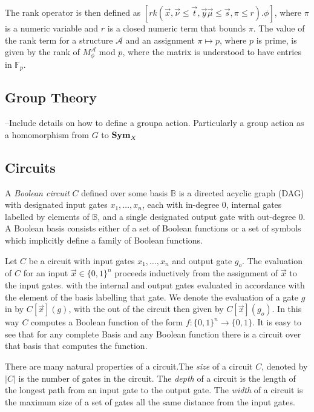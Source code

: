 \documentclass[../paper.tex]{subfiles}
\begin{document}
The rank operator is then defined as $[rk (\vec{x}, \vec {\nu} \leq \vec{t},
\vec{y}\vec{\mu} \leq \vec{s}, \pi \leq r). \phi]$, where $\pi$ is a numeric
variable and $r$ is a closed numeric term that bounds $\pi$. The value of the
rank term for a structure $\mathcal{A}$ and an assignment $\pi \mapsto p$, where
$p$ is prime, is given by the rank  of $M^{\mathcal{A}}_\phi$ mod $p$, where the
matrix is understood to have entries in $\mathbb{F}_p$.

\subsection{Group Theory}
--Include details on how to define a groupa action. Particularly a group action
as a homomorphism from $G$ to $\text{\textbf{Sym}}_X$

\subsection{Circuits}
A \emph{Boolean circuit} $C$ defined over some basis $\mathbb{B}$ is a directed
acyclic graph (DAG) with designated input gates $x_1, \ldots, x_n$, each with
in-degree $0$, internal gates labelled by elements of $\mathbb{B}$, and a single
designated output gate with out-degree 0. A Boolean basis consists either of a
set of Boolean functions or a set of symbols which implicitly define a family of
Boolean functions.

Let $C$ be a circuit with input gates $x_1, \ldots, x_n$ and output gate $g_o$.
The evaluation of $C$ for an input $\vec{x}\in \{0,1\}^n$ proceeds inductively
from the assignment of $\vec{x}$ to the input gates. with the internal and
output gates evaluated in accordance with the element of the basis labelling
that gate. We denote the evaluation of a gate $g$ in by $C[\vec{x}](g)$, with
the out of the circuit then given by $C[\vec{x}](g_o)$. In this way $C$ computes
a Boolean function of the form $f:\{0,1\}^n \rightarrow \{0,1\}$. It is easy to
see that for any complete Basis and any Boolean function there is a circuit over
that basis that computes the function.


There are many natural properties of a circuit.The \emph{size} of a circuit $C$,
denoted by $\vert C \vert$ is the number of gates in the circuit. The
\emph{depth} of a circuit is the length of the longest path from an input gate
to the output gate. The \emph{width} of a circuit is the maximum size of a set
of gates all the same distance from the input gates.
\end{document}
